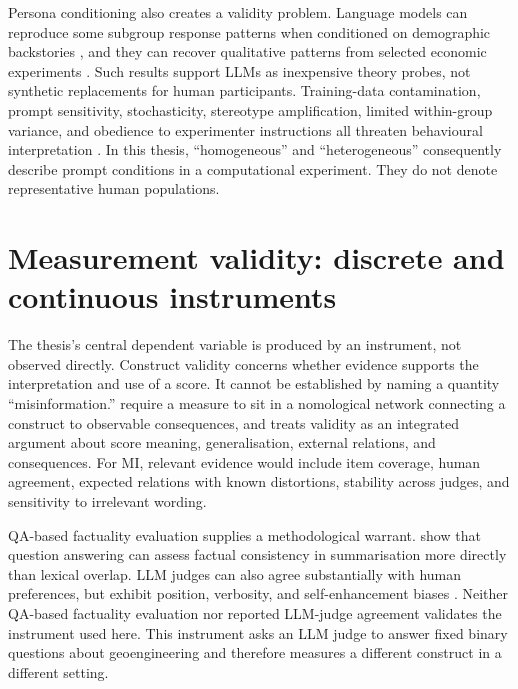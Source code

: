 Persona conditioning also creates a validity problem.  Language models can
reproduce some subgroup response patterns when conditioned on demographic
backstories \parencite{argyle2023one}, and they can recover qualitative patterns
from selected economic experiments \parencite{horton2023silicus}.  Such results
support LLMs as inexpensive theory probes, not synthetic replacements for human
participants.  Training-data contamination, prompt sensitivity, stochasticity,
stereotype amplification, limited within-group variance, and obedience to
experimenter instructions all threaten behavioural interpretation
\parencite{larooij2025validation,argyle2023one}.  In this
thesis, ``homogeneous'' and ``heterogeneous'' consequently describe prompt
conditions in a computational experiment.  They do not denote representative
human populations.

\section{Measurement validity: discrete and continuous instruments}
\label{sec:lit-validity}

The thesis's central dependent variable is produced by an instrument, not
observed directly.  Construct validity concerns whether evidence supports the
interpretation and use of a score.  It cannot be established by naming a
quantity ``misinformation.''  \textcite{cronbach1955construct} require a measure
to sit in a nomological network connecting a construct to observable
consequences, and \textcite{messick1995validity} treats validity as an integrated
argument about score meaning, generalisation, external relations, and
consequences.  For MI, relevant evidence would include item coverage, human
agreement, expected relations with known distortions, stability across judges,
and sensitivity to irrelevant wording.

QA-based factuality evaluation supplies a methodological warrant.
\textcite{fabbri2022qafacteval} show that question answering can assess factual
consistency in summarisation more directly than lexical overlap.  LLM judges can
also agree substantially with human preferences, but exhibit position,
verbosity, and self-enhancement biases \parencite{zheng2023judge}.  Neither QA-based factuality evaluation nor reported LLM-judge agreement
validates the instrument used here. This instrument asks an LLM judge to
answer fixed binary questions about geoengineering and therefore measures a
different construct in a different setting.

